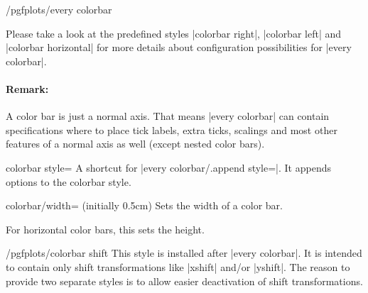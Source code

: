 \begin{stylekey}{/pgfplots/every colorbar}
\begin{codeexample}[]
\end{codeexample}
	Please take a look at the predefined styles |colorbar right|, |colorbar left| and |colorbar horizontal| for more details about configuration possibilities for |every colorbar|.

	\paragraph{Remark:} A color bar is just a normal axis. That means |every colorbar| can contain specifications where to place tick labels, extra ticks, scalings and most other features of a normal axis as well (except nested color bars).
\end{stylekey}

\begin{pgfplotskey}{colorbar style=}
	A shortcut for |every colorbar/.append style=|. It appends options to the colorbar style.
\end{pgfplotskey}

\begin{pgfplotskey}{colorbar/width= (initially 0.5cm)}
	Sets the width of a color bar.
\pgfplotsexpensiveexample
\begin{codeexample}[]
\end{codeexample}

	For horizontal color bars, this sets the height.
\end{pgfplotskey}


\begin{stylekey}{/pgfplots/colorbar shift}
	This style is installed after |every colorbar|. It is intended to contain only shift transformations like |xshift| and/or |yshift|. The reason to provide two separate styles is to allow easier deactivation of shift transformations.

\begin{codeexample}
\end{codeexample}
\end{stylekey}


